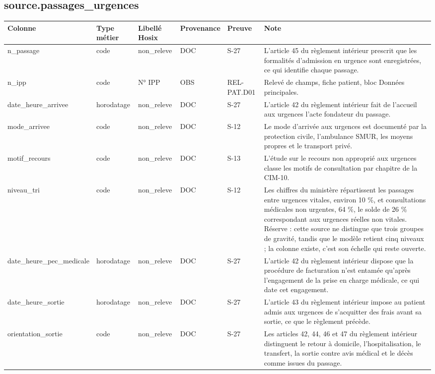\subsection*{source.passages\_urgences}
\begin{longtable}{p{2.5cm}p{1.8cm}p{2.8cm}p{1.3cm}p{2.2cm}p{5cm}}
\hline
Colonne & Type métier & Libellé Hosix & Provenance & Preuve & Note \\
\hline
\endhead
n\_passage & code & non\_releve & DOC & S-27 & L'article 45 du règlement intérieur prescrit que les formalités d'admission en urgence sont enregistrées, ce qui identifie chaque passage. \\
n\_ipp & code & N° IPP & OBS & REL-PAT.D01 & Relevé de champs, fiche patient, bloc Données principales. \\
date\_heure\_arrivee & horodatage & non\_releve & DOC & S-27 & L'article 42 du règlement intérieur fait de l'accueil aux urgences l'acte fondateur du passage. \\
mode\_arrivee & code & non\_releve & DOC & S-12 & Le mode d'arrivée aux urgences est documenté par la protection civile, l'ambulance SMUR, les moyens propres et le transport privé. \\
motif\_recours & code & non\_releve & DOC & S-13 & L'étude sur le recours non approprié aux urgences classe les motifs de consultation par chapitre de la CIM-10. \\
niveau\_tri & code & non\_releve & DOC & S-12 & Les chiffres du ministère répartissent les passages entre urgences vitales, environ 10 \%, et consultations médicales non urgentes, 64 \%, le solde de 26 \% correspondant aux urgences réelles non vitales. Réserve : cette source ne distingue que trois groupes de gravité, tandis que le modèle retient cinq niveaux ; la colonne existe, c'est son échelle qui reste ouverte. \\
date\_heure\_pec\_medicale & horodatage & non\_releve & DOC & S-27 & L'article 42 du règlement intérieur dispose que la procédure de facturation n'est entamée qu'après l'engagement de la prise en charge médicale, ce qui date cet engagement. \\
date\_heure\_sortie & horodatage & non\_releve & DOC & S-27 & L'article 43 du règlement intérieur impose au patient admis aux urgences de s'acquitter des frais avant sa sortie, ce que le règlement précède. \\
orientation\_sortie & code & non\_releve & DOC & S-27 & Les articles 42, 44, 46 et 47 du règlement intérieur distinguent le retour à domicile, l'hospitalisation, le transfert, la sortie contre avis médical et le décès comme issues du passage. \\

\end{longtable}
